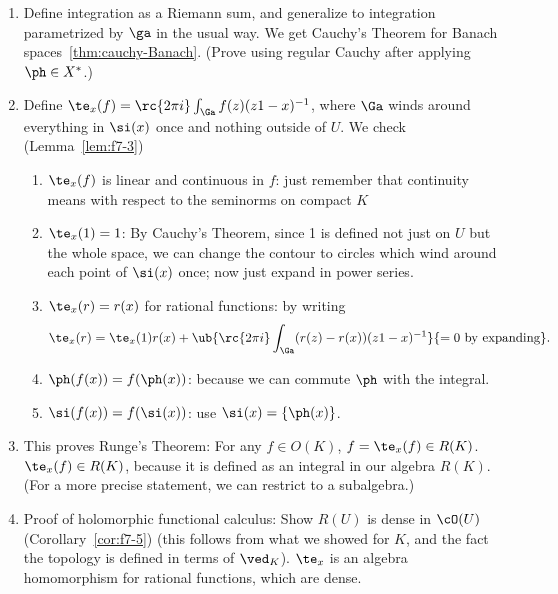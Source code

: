 \begin{enumerate}
\item
Define integration as a Riemann sum, and generalize to integration parametrized by $\ga$ in the usual way. We get Cauchy's Theorem for Banach spaces~\ref{thm:cauchy-Banach}. (Prove using regular Cauchy after applying $\ph\in X^*$.)
\item
Define $\te_x(f)=\rc{2\pi i}\int_{\Ga}f(z)(z1-x)^{-1}$, where $\Ga$ winds around everything in $\si(x)$ once and nothing outside of $U$. 
We check (Lemma~\ref{lem:f7-3})
\begin{enumerate}
\item
$\te_x(f)$ is linear and continuous in $f$: just remember that continuity means with respect to the seminorms on compact $K$
\item
$\te_x(1)=1$: By Cauchy's Theorem, since 1 is defined not just on $U$ but the whole space, we can change the contour to circles which wind around each point of $\si(x)$ once; now just expand in power series.
\item
$\te_x(r)=r(x)$ for rational functions: by writing
\[
\te_x(r)=\te_x(1)r(x)+\ub{\rc{2\pi i}\int_{\Ga}(r(z)-r(x))(z1-x)^{-1}}{=0\text{ by expanding}}.
\]
\item
$\ph(f(x))=f(\ph(x))$: because we can commute $\ph$ with the integral.
\item
$\si(f(x))=f(\si(x))$: use $\si(x)=\{\ph(x)\}$.
\end{enumerate}
\item This proves Runge's Theorem: For any $f\in O(K)$, $f=\te_x(f)\in R(K)$. $\te_x(f)\in R(K)$, because it is defined as an integral in our algebra $R(K)$. (For a more precise statement, we can restrict to a subalgebra.)
\item Proof of holomorphic functional calculus: Show $R(U)$ is dense in $\cO(U)$ (Corollary~\ref{cor:f7-5}) (this follows from what we showed for $K$, and the fact the topology is defined in terms of $\ved_K$). $\te_x$ is an algebra homomorphism for rational functions, which are dense.
\end{enumerate}
